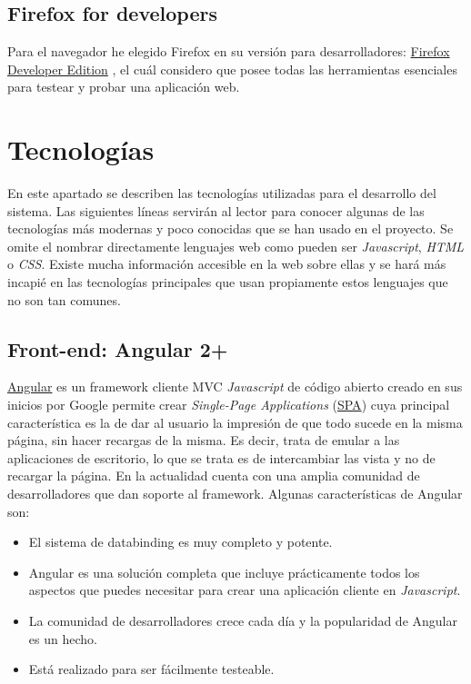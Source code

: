 


\subsection{Firefox for developers}\label{herramientas_firefox}
Para el navegador he elegido Firefox en su versión para desarrolladores: \href{https://www.mozilla.org/es-ES/firefox/developer}{Firefox Developer Edition} , el cuál considero que posee todas las herramientas esenciales para testear y probar una aplicación web.


\section{Tecnologías}\label{tecnologias}
 En este apartado se describen las tecnologías utilizadas para el desarrollo del sistema. Las siguientes líneas servirán al lector para conocer algunas de las tecnologías más modernas y poco conocidas que se han usado en el proyecto. Se omite el nombrar directamente lenguajes web como pueden ser \emph{Javascript}, \emph{HTML} o \emph{CSS}. Existe mucha información accesible en la web sobre ellas y se hará más incapié en las tecnologías principales que usan propiamente estos lenguajes que no son tan comunes.
 
 \subsection{Front-end: Angular 2+}\label{tecnologias_angular}
 \href{https://angular.io}{Angular} es un framework cliente MVC \emph{Javascript} de código abierto creado en sus inicios por Google permite crear  \emph{Single-Page Applications} (\href{https://es.wikipedia.org/wiki/Single-page_application}{SPA})  cuya principal característica es la de dar al usuario la impresión de que todo sucede en la misma página, sin hacer recargas de la misma. Es decir, trata de emular a las aplicaciones de escritorio, lo que se trata es de intercambiar las vista y no de recargar la página. En la actualidad cuenta con una amplia comunidad de desarrolladores  que dan soporte al framework.  Algunas características de Angular son:
 
\begin{itemize}
\tightlist
\item
  El sistema de databinding es muy completo y potente.
\item
  Angular es una solución completa que incluye prácticamente todos los aspectos que puedes necesitar para crear una aplicación cliente en \emph{Javascript}. 
\item
  La comunidad de desarrolladores crece cada día y la popularidad de Angular es un hecho.
  \item
  Está realizado para ser fácilmente testeable.
\end{itemize}
 
